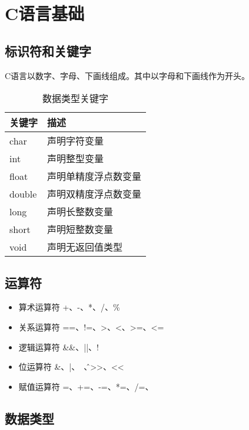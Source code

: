 \section{C语言基础}

\subsection{标识符和关键字}
C语言以数字、字母、下画线组成。其中以字母和下画线作为开头。

\begin{table}
    \centering
    \caption{数据类型关键字}
    \begin{tabular}{ll}
        \toprule
        关键字 & 描述 \\
		\midrule
        char & 声明字符变量 \\
        int & 声明整型变量 \\
        float & 声明单精度浮点数变量 \\
        double & 声明双精度浮点数变量\\
        long & 声明长整数变量 \\
        short & 声明短整数变量 \\
        void & 声明无返回值类型 \\
		\bottomrule
	\end{tabular}
\end{table}


\subsection{运算符}

\begin{itemize}
	\item 算术运算符 +、-、*、/、\%
	\item 关系运算符 ==、!=、>、<、>=、<=
	\item 逻辑运算符 \&\&、||、!
	\item 位运算符 \&、|、~、\^、>>、<<
	\item 赋值运算符 =、+=、-=、*=、/=、%
\end{itemize}



\subsection{数据类型}

